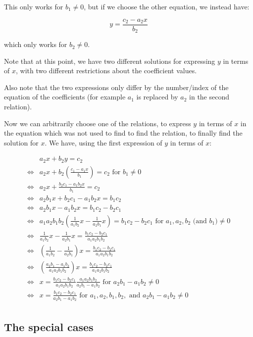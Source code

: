 \documentclass[11pt]{article}
\begin{document}
This only works for $b_1 \neq 0$, but if we choose the other equation, we instead have:

$$y = \frac{c_2 - a_2 x}{b_2}$$

which only works for $b_2 \neq 0$.

Note that at this point, we have two different solutions for expressing $y$ in terms of $x$, with two different restrictions about the coefficient values.

Also note that the two expressions only differ by the number/index of the equation of the coefficients (for example $a_1$ is replaced by $a_2$ in the second relation).

Now we can arbitrarily choose one of the relations, to express $y$ in terms of $x$ in the equation which was not used to find to find the relation, to finally find the solution for $x$.
We have, using the first expression of $y$ in terms of $x$:

\begin{align*}
    &a_2 x + b_2 y = c_2 \\
    \iff &a_2 x + b_2 (\frac{c_1 - a_1 x}{b_1}) = c_2  \text{ for } b_1 \neq 0\\
    \iff &a_2 x + \frac{b_2 c_1 - a_1 b_2 x}{b_1} = c_2 \\
    \iff &a_2 b_1 x + b_2 c_1 - a_1 b_2 x = b_1 c_2 \\
    \iff &a_2 b_1 x - a_1 b_2 x = b_1 c_2 - b_2 c_1 \\
    \iff &a_1 a_2 b_1 b_2 (\frac{1}{a_1 b_2} x - \frac{1}{a_2 b_1} x) = b_1 c_2 - b_2 c_1 \text{ for } a_1, a_2, b_2 \text{ (and } b_1 \text{)} \neq 0 \\
    \iff &\frac{1}{a_1 b_2} x - \frac{1}{a_2 b_1} x = \frac{b_1 c_2 - b_2 c_1}{a_1 a_2 b_1 b_2} \\
    \iff &(\frac{1}{a_1 b_2} - \frac{1}{a_2 b_1}) x = \frac{b_1 c_2 - b_2 c_1}{a_1 a_2 b_1 b_2} \\
    \iff &(\frac{a_2 b_1 - a_1 b_2}{a_1 a_2 b_1 b_2}) x = \frac{b_1 c_2 - b_2 c_1}{a_1 a_2 b_1 b_2} \\
    \iff &x = \frac{b_1 c_2 - b_2 c_1}{a_1 a_2 b_1 b_2} \frac{a_1 a_2 b_1 b_2}{a_2 b_1 - a_1 b_2} \text{ for } a_2 b_1 - a_1 b_2 \neq 0 \\
    \iff &x = \frac{b_1 c_2 - b_2 c_1}{a_2 b_1 - a_1 b_2} \text{ for } a_1, a_2, b_1, b_2, \text{ and } a_2 b_1 - a_1 b_2 \neq 0 \\
\end{align*}

\subsection{The special cases}
\end{document}
